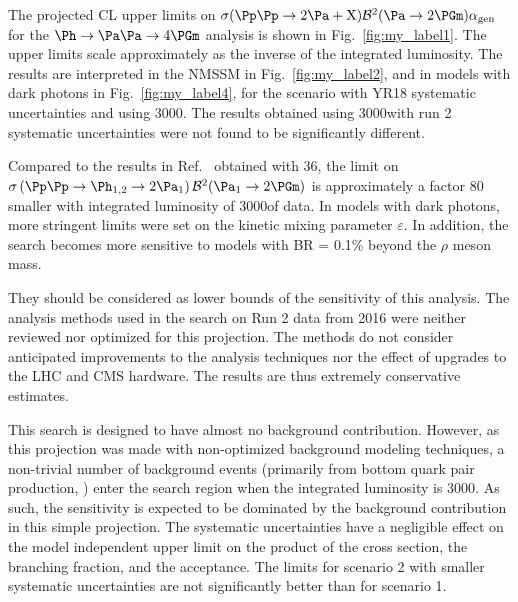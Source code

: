 The projected CL upper limits on ${\sigma(\Pp\Pp \to 2 \Pa + \PX)  \mathcal{B}^2 (\Pa \to 2\PGm)  \alphaGen}$ for the $\Ph\to\Pa\Pa\to4\PGm$ analysis is shown in Fig.~\ref{fig:my_label1}. The upper limits scale approximately as the inverse of the integrated luminosity. The results are interpreted in the NMSSM in Fig.~\ref{fig:my_label2}, and in models with dark photons in Fig.~\ref{fig:my_label4}, for the scenario with YR18 systematic uncertainties and using 3000\fbinv. The results obtained using 3000\fbinv with run 2 systematic uncertainties were not found to be significantly different.

Compared to the results in Ref.~\cite{CMS-PAS-HIG-18-003} obtained with 36\fbinv, the limit on $\sigma \left( \Pp\Pp \to \PhOneTwo \to 2 \PaOne \right) \mathcal{B}^2(\PaOne \to 2\PGm)$ is approximately a factor 80 smaller with integrated luminosity of 3000\fbinv of data. In models with dark photons, more stringent limits were set on the kinetic mixing parameter $\varepsilon$. In addition, the search becomes more sensitive to models with BR = 0.1\% beyond the $\rho$ meson mass.

They should be considered as lower bounds of the sensitivity of this analysis. The analysis methods used in the search on Run 2 data from 2016 were neither reviewed nor optimized for this projection. The methods do not consider anticipated improvements to the analysis techniques nor the effect of upgrades to the LHC and CMS hardware. The results are thus extremely conservative estimates.

This search is designed to have almost no background contribution. However, as this projection was made with non-optimized background modeling techniques, a non-trivial number of background events (primarily from bottom quark pair production, \bbbar) enter the search region when the integrated luminosity is 3000\fbinv. As such, the sensitivity is expected to be dominated by the background contribution in this simple projection. The systematic uncertainties have a negligible effect on the model independent upper limit on the product of the cross section, the branching fraction, and the acceptance. The limits for scenario 2 with smaller systematic uncertainties are not significantly better than for scenario 1.

